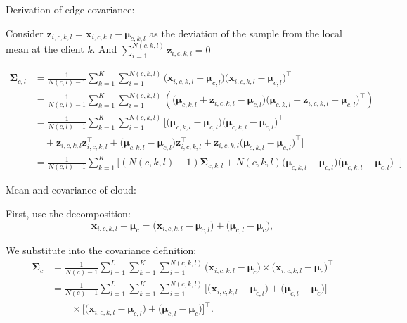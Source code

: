 \documentclass[journal]{IEEEtran}
\begin{document}
Derivation of edge covariance:

Consider \( \mathbf{z}_{i,c,k,l} = \mathbf{x}_{i,c,k,l} - \mathbf{\mu}_{c,k,l} \) as the deviation of the sample from the local mean at the client \(k \). And \(\sum_{i=1}^{N(c,k,l)} \mathbf{z}_{i,c,k,l} = 0  \)

\begin{align*}
  \mathbf{\Sigma}_{c,l} &= \frac{1}{N(c,l)-1} \sum_{k=1}^K \sum_{i=1}^{N(c,k,l)} \big( \mathbf{x}_{i,c,k,l} - \mathbf{\mu}_{c,l} \big) \big( \mathbf{x}_{i,c,k,l} - \mathbf{\mu}_{c,l} \big)^\top \\
  &= \frac{1}{N(c,l)-1} \sum_{k=1}^K \sum_{i=1}^{N(c,k,l)} \left( \big( \mathbf{\mu}_{c,k,l} + \mathbf{z}_{i,c,k,l} - \mathbf{\mu}_{c,l} \big) \big( \mathbf{\mu}_{c,k,l} + \mathbf{z}_{i,c,k,l} - \mathbf{\mu}_{c,l} \big)^\top \right) \\
  &= \frac{1}{N(c,l)-1} \sum_{k=1}^K \sum_{i=1}^{N(c,k,l)} \Bigg[ \big( \mathbf{\mu}_{c,k,l} - \mathbf{\mu}_{c,l} \big) \big( \mathbf{\mu}_{c,k,l} - \mathbf{\mu}_{c,l} \big)^\top \\
  &\quad + \mathbf{z}_{i,c,k,l} \mathbf{z}_{i,c,k,l}^\top + \big( \mathbf{\mu}_{c,k,l} - \mathbf{\mu}_{c,l} \big) \mathbf{z}_{i,c,k,l}^\top + \mathbf{z}_{i,c,k,l} \big( \mathbf{\mu}_{c,k,l} - \mathbf{\mu}_{c,l} \big)^\top \Bigg] \\
  &= \frac{1}{N(c,l)-1} \sum_{k=1}^K \Bigg[ (N(c,k,l)-1) \mathbf{\Sigma}_{c,k,l} + N(c,k,l) \big( \mathbf{\mu}_{c,k,l} - \mathbf{\mu}_{c,l} \big) \big( \mathbf{\mu}_{c,k,l} - \mathbf{\mu}_{c,l} \big)^\top \Bigg]
\end{align*}

Mean and covariance of cloud:

First, use the decomposition:
\begin{equation}
\mathbf{x}_{i,c,k,l} - \mathbf{\mu}_c = \big( \mathbf{x}_{i,c,k,l} - \mathbf{\mu}_{c,l} \big) + \big( \mathbf{\mu}_{c,l} - \mathbf{\mu}_c \big),
\end{equation}

We substitute into the covariance definition:
\begin{align*}
\mathbf{\Sigma}_c 
&= \frac{1}{N(c)-1} \sum_{l=1}^L \sum_{k=1}^K \sum_{i=1}^{N(c,k,l)} 
\big( \mathbf{x}_{i,c,k,l} - \mathbf{\mu}_c \big) \nonumber \times 
\big( \mathbf{x}_{i,c,k,l} - \mathbf{\mu}_c \big)^\top \\ 
&= \frac{1}{N(c)-1} \sum_{l=1}^L \sum_{k=1}^K \sum_{i=1}^{N(c,k,l)} 
\Big[
\big( \mathbf{x}_{i,c,k,l} - \mathbf{\mu}_{c,l} \big) + \big( \mathbf{\mu}_{c,l} - \mathbf{\mu}_c \big)
\Big] \nonumber \\
&\qquad \times 
\Big[
\big( \mathbf{x}_{i,c,k,l} - \mathbf{\mu}_{c,l} \big) + \big( \mathbf{\mu}_{c,l} - \mathbf{\mu}_c \big)
\Big]^\top.
\end{align*}
\end{document}
